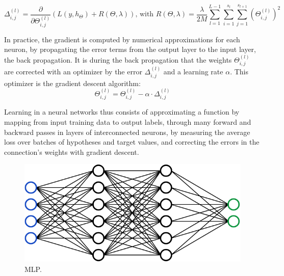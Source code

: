 \[ \Delta_{i,j}^{(l)} = \frac{\partial}{\partial \Theta_{i,j}^{(l)}} (L(y,h_{\Theta}) + R(\Theta, \lambda)) \text{, with } R(\Theta, \lambda) = \frac{\lambda}{2M}\sum_{l=1}^{L-1}\sum_{i=1}^{s_l}\sum_{j=1}^{s_{l+1}}(\Theta_{i,j}^{(l)})^2 \]

In practice, the gradient is computed by numerical approximations for each neuron, by propagating the error terms from the output layer to the input layer, the back propagation. It is during the back propagation that the weights $\Theta_{i,j}^{(l)}$ are corrected with an optimizer by the error $\Delta_{i,j}^{(l)}$ and a learning rate $\alpha$. This optimizer is the gradient descent algorithm:
\[ \Theta_{i,j}^{(l)} = \Theta_{i,j}^{(l)} - \alpha \cdot \Delta_{i,j}^{(l)} \]

Learning in a neural networks thus consists of approximating a function by mapping from input training data to output labels, through many forward and backward passes in layers of interconnected neurons, by measuring the average loss over batches of hypotheses and target values, and correcting the errors in the connection's weights with gradient descent. \\

\begin{figure}
\includegraphics[scale=0.5]{img/I/Selection_098.png}
\centering
\caption{MLP.}
\end{figure}

